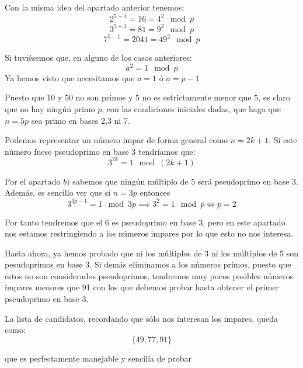 \begin{problem}[9]
Con la misma idea del apartado anterior tenemos:
\[2^{5-1} = 16=4^2 \mod p\]
\[3^{5-1} = 81=9^2 \mod p\]
\[7^{5-1} = 2041=49^2 \mod p\]

Si tuviésemos que, en alguno de los casos anteriores:
\[a^2 =1 \mod p\]
Ya hemos visto que necesitamos que $a=1$ ó $a=p-1$

Puesto que 10 y 50 no son primos y 5 no es estrictamente menor que $5$, es claro que no hay ningún primo $p$, con las condiciones iniciales dadas, que haga que $n=5p$ sea primo en bases 2,3 ni 7.

\spart

Podemos representar un número impar de forma general como $n=2k+1$. Si este número fuese pseudoprimo en base 3 tendríamos que:
\[3^{2k} = 1 \mod (2k+1)\]

Por el apartado $b)$ sabemos que ningún múltiplo de $5$ será pseudoprimo en base $3$. Además, es sencillo ver que si $n=3p$ entonces
\[3^{3p-1}=1 \mod 3p \implies 3^2 =1 \mod p \iff p=2\]

Por tanto tendremos que el $6$ es pseudoprimo en base 3, pero en este apartado nos estamos restringiendo a los números impares por lo que esto no nos interesa.

Hasta ahora, ya hemos probado que ni los múltiplos de 3 ni los múltiplos de 5 son pesudoprimos en base 3. Si demás eliminamos a los números primos, puesto que estos no son considerados pseudoprimos, tendremos muy pocos posibles números impares menores que 91 con los que debemos probar hasta obtener el primer pseudoprimo en base 3.

La lista de candidatos, recordando que sólo nos interesan los impares, queda como:
\[\{49, 77, 91\}\]

que es perfectamente manejable y sencilla de probar
\end{problem}


